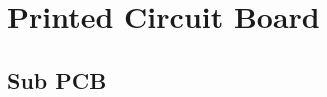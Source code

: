 \newpage

\section{Printed Circuit Board}\label{03Sec:PCB}



    


\subsection{Sub PCB}\label{03Sub:}




